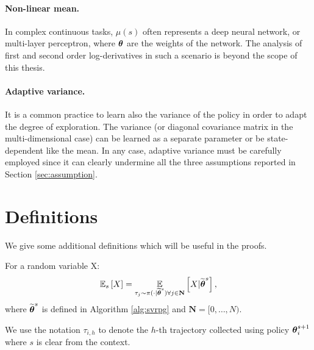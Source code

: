 \paragraph{Non-linear mean.}
In complex continuous tasks, $\mu(s)$ often represents a deep neural network, or multi-layer perceptron, where $\vtheta$ are the weights of the network. The analysis of first and second order log-derivatives in such a scenario is beyond the scope of this thesis.

\paragraph{Adaptive variance.}
It is a common practice to learn also the variance of the policy in order to adapt the degree of exploration. The variance (or diagonal covariance matrix in the multi-dimensional case) can be learned as a separate parameter or be state-dependent like the mean. In any case, adaptive variance must be carefully employed since it can clearly undermine all the three assumptions reported in Section  \ref{sec:assumption}.

\section{Definitions}\label{sec:definition}

We give some additional definitions which will be useful in the proofs.

\begin{definition}
	For a random variable X:
	\[
	\Es{X} = \EVV[\tau_j\sim\pi(\cdot\vert\wt{\vtheta}^s)
	\forall j\in\mathbf{N}]{X\vert\wt{\vtheta}^s},
	\]
	where $\wt{\vtheta}^s$ is defined in Algorithm \ref{alg:svrpg} and $\mathbf{N} = [0,\dots,N)$.
\end{definition}

We use the notation $\tau_{i,h}$ to denote the $h$-th trajectory collected using policy $\vtheta^{s+1}_i$ where $s$ is clear from the context.

